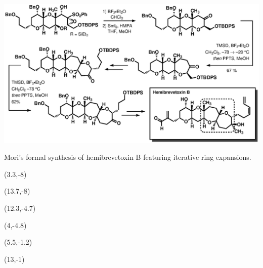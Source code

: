 \begin{Scheme}[t]
  \centering \includegraphics[scale=0.8]{chp_singlecarbon/images/moritwo}
  \caption{Mori's formal synthesis of hemibrevetoxin B featuring iterative
  ring expansions.}
  \begin{textblock}{1}(3.3,-8)  \end{textblock}
  \begin{textblock}{1}(13.7,-8)  \end{textblock}
  \begin{textblock}{1}(12.3,-4.7)  \end{textblock}
  \begin{textblock}{1}(4,-4.8)  \end{textblock}
  \begin{textblock}{1}(5.5,-1.2)  \end{textblock}
  \begin{textblock}{1}(13,-1)  \end{textblock}
  \label{sch:mori}
\end{Scheme}

